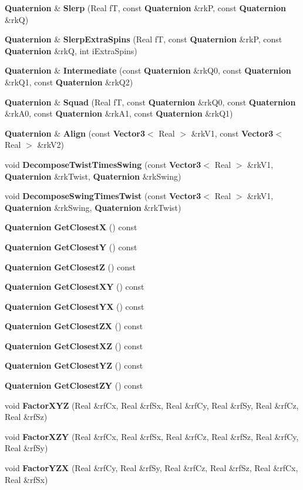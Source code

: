 \begin{CompactItemize}
\item 
{\bf Quaternion} \& {\bf Slerp} (Real f\-T, const {\bf Quaternion} \&rk\-P, const {\bf Quaternion} \&rk\-Q)
\item 
{\bf Quaternion} \& {\bf Slerp\-Extra\-Spins} (Real f\-T, const {\bf Quaternion} \&rk\-P, const {\bf Quaternion} \&rk\-Q, int i\-Extra\-Spins)
\item 
{\bf Quaternion} \& {\bf Intermediate} (const {\bf Quaternion} \&rk\-Q0, const {\bf Quaternion} \&rk\-Q1, const {\bf Quaternion} \&rk\-Q2)
\item 
{\bf Quaternion} \& {\bf Squad} (Real f\-T, const {\bf Quaternion} \&rk\-Q0, const {\bf Quaternion} \&rk\-A0, const {\bf Quaternion} \&rk\-A1, const {\bf Quaternion} \&rk\-Q1)
\item 
{\bf Quaternion} \& {\bf Align} (const {\bf Vector3}$<$ Real $>$ \&rk\-V1, const {\bf Vector3}$<$ Real $>$ \&rk\-V2)
\item 
void {\bf Decompose\-Twist\-Times\-Swing} (const {\bf Vector3}$<$ Real $>$ \&rk\-V1, {\bf Quaternion} \&rk\-Twist, {\bf Quaternion} \&rk\-Swing)
\item 
void {\bf Decompose\-Swing\-Times\-Twist} (const {\bf Vector3}$<$ Real $>$ \&rk\-V1, {\bf Quaternion} \&rk\-Swing, {\bf Quaternion} \&rk\-Twist)
\item 
{\bf Quaternion} {\bf Get\-Closest\-X} () const
\item 
{\bf Quaternion} {\bf Get\-Closest\-Y} () const
\item 
{\bf Quaternion} {\bf Get\-Closest\-Z} () const
\item 
{\bf Quaternion} {\bf Get\-Closest\-XY} () const
\item 
{\bf Quaternion} {\bf Get\-Closest\-YX} () const
\item 
{\bf Quaternion} {\bf Get\-Closest\-ZX} () const
\item 
{\bf Quaternion} {\bf Get\-Closest\-XZ} () const
\item 
{\bf Quaternion} {\bf Get\-Closest\-YZ} () const
\item 
{\bf Quaternion} {\bf Get\-Closest\-ZY} () const
\item 
void {\bf Factor\-XYZ} (Real \&rf\-Cx, Real \&rf\-Sx, Real \&rf\-Cy, Real \&rf\-Sy, Real \&rf\-Cz, Real \&rf\-Sz)
\item 
void {\bf Factor\-XZY} (Real \&rf\-Cx, Real \&rf\-Sx, Real \&rf\-Cz, Real \&rf\-Sz, Real \&rf\-Cy, Real \&rf\-Sy)
\item 
void {\bf Factor\-YZX} (Real \&rf\-Cy, Real \&rf\-Sy, Real \&rf\-Cz, Real \&rf\-Sz, Real \&rf\-Cx, Real \&rf\-Sx)

\end{CompactItemize}
